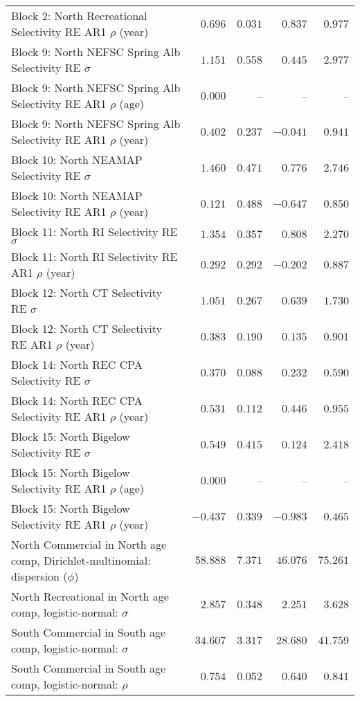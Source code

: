 \documentclass[
]{article}
\begin{document}
\begin{landscape}
\begin{longtable}[t]{lrrrr}
Block 2: North Recreational Selectivity RE AR1 $\rho$ (year) & $0.696$ & $0.031$ & $0.837$ & $0.977$\\
\addlinespace
Block 9: North NEFSC Spring Alb Selectivity RE $\sigma$ & $1.151$ & $0.558$ & $0.445$ & $2.977$\\
Block 9: North NEFSC Spring Alb Selectivity RE AR1 $\rho$ (age) & $0.000$ & -- & -- & --\\
Block 9: North NEFSC Spring Alb Selectivity RE AR1 $\rho$ (year) & $0.402$ & $0.237$ & $-0.041$ & $0.941$\\
Block 10: North NEAMAP Selectivity RE $\sigma$ & $1.460$ & $0.471$ & $0.776$ & $2.746$\\
Block 10: North NEAMAP Selectivity RE AR1 $\rho$ (year) & $0.121$ & $0.488$ & $-0.647$ & $0.850$\\
\addlinespace
Block 11: North RI Selectivity RE $\sigma$ & $1.354$ & $0.357$ & $0.808$ & $2.270$\\
Block 11: North RI Selectivity RE AR1 $\rho$ (year) & $0.292$ & $0.292$ & $-0.202$ & $0.887$\\
Block 12: North CT Selectivity RE $\sigma$ & $1.051$ & $0.267$ & $0.639$ & $1.730$\\
Block 12: North CT Selectivity RE AR1 $\rho$ (year) & $0.383$ & $0.190$ & $0.135$ & $0.901$\\
Block 14: North REC CPA Selectivity RE $\sigma$ & $0.370$ & $0.088$ & $0.232$ & $0.590$\\
\addlinespace
Block 14: North REC CPA Selectivity RE AR1 $\rho$ (year) & $0.531$ & $0.112$ & $0.446$ & $0.955$\\
Block 15: North Bigelow Selectivity RE $\sigma$ & $0.549$ & $0.415$ & $0.124$ & $2.418$\\
Block 15: North Bigelow Selectivity RE AR1 $\rho$ (age) & $0.000$ & -- & -- & --\\
Block 15: North Bigelow Selectivity RE AR1 $\rho$ (year) & $-0.437$ & $0.339$ & $-0.983$ & $0.465$\\
North Commercial in North age comp, Dirichlet-multinomial: dispersion ($\phi$) & $58.888$ & $7.371$ & $46.076$ & $75.261$\\
\addlinespace
North Recreational in North age comp, logistic-normal: $\sigma$ & $2.857$ & $0.348$ & $2.251$ & $3.628$\\
South Commercial in South age comp, logistic-normal: $\sigma$ & $34.607$ & $3.317$ & $28.680$ & $41.759$\\
South Commercial in South age comp, logistic-normal: $\rho$ & $0.754$ & $0.052$ & $0.640$ & $0.841$\\

\end{longtable}
\end{landscape}
\end{document}
